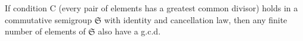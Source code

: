If condition C (every pair of elements has a greatest common divisor) holds in a commutative semigroup $\mathfrak{S}$ with identity and cancellation law, then any finite number of elements of $\mathfrak{S}$ also have a g.c.d.
